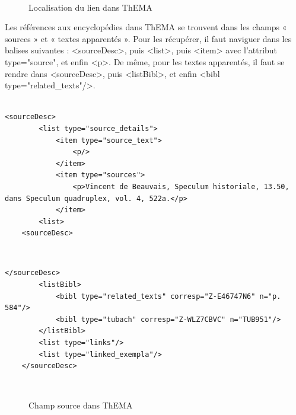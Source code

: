 \

\begin{figure}[H]
	\centering
	\caption{Localisation du lien dans ThEMA}
\end{figure}

Les références aux encyclopédies dans ThEMA se trouvent dans les champs « sources » et « textes apparentés ». Pour les récupérer, il faut naviguer dans les balises suivantes : <sourceDesc>, puis <list>, puis <item> avec l'attribut type="source", et enfin <p>. De même, pour les textes apparentés, il faut se rendre dans <sourceDesc>, puis <listBibl>, et enfin <bibl type="related\_texts"/>. \\

\

\begin{lstlisting}[breaklines=true]
	<sourceDesc>
		<list type="source_details">
			<item type="source_text">
				<p/>
			</item>
			<item type="sources">
				<p>Vincent de Beauvais, Speculum historiale, 13.50, dans Speculum quadruplex, vol. 4, 522a.</p>
			</item>
		<list>
	<sourceDesc>	
\end{lstlisting} 

\

\begin{lstlisting}[breaklines=true]
	</sourceDesc>
		<listBibl>
			<bibl type="related_texts" corresp="Z-E46747N6" n="p. 584"/>
			<bibl type="tubach" corresp="Z-WLZ7CBVC" n="TUB951"/>
		</listBibl>
		<list type="links"/>
		<list type="linked_exempla"/>
	</sourceDesc>
\end{lstlisting} 

\

\begin{figure}[H]
	\centering
	\caption{Champ source dans ThEMA}
\end{figure}

